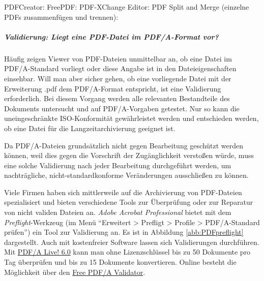 \begin{flushleft}
	PDFCreator: 
	FreePDF: 
	PDF-XChange Editor: 
	PDF Split and Merge (einzelne PDFs zusammenfügen und trennen): 	
\end{flushleft}


\subparagraph{Validierung: Liegt eine PDF-Datei im PDF/A-Format vor?}
\label{pdf-validierung}
Häufig zeigen Viewer von PDF-Dateien unmittelbar an, ob eine Datei im PDF/A-Standard vorliegt oder diese Angabe ist in den Dateieigenschaften einsehbar. Will man aber sicher gehen, ob eine vorliegende Datei mit der Erweiterung .pdf dem PDF/A-Format entspricht, ist eine Validierung erforderlich. Bei diesem Vorgang werden alle relevanten Bestandteile des Dokuments untersucht und auf PDF/A-Vorgaben getestet. Nur so kann die uneingeschränkte ISO-Konformität gewährleistet werden und entschieden werden, ob eine Datei für die Langzeitarchivierung geeignet ist.  

Da PDF/A-Dateien grundsätzlich nicht gegen Bearbeitung geschützt werden können, weil dies gegen die Vorschrift der Zugänglichkeit verstoßen würde, muss eine solche Validierung nach jeder Bearbeitung durchgeführt werden, um nachträgliche, nicht-standardkonforme Veränderungen ausschließen zu können. 

Viele Firmen haben sich mittlerweile auf die Archivierung von PDF-Dateien spezialisiert und bieten verschiedene Tools zur Überprüfung oder zur Reparatur von nicht validen Dateien an. \emph{Adobe Acrobat Professional} bietet mit dem \emph{Preflight}-Werkzeug (im Menü "`Erweitert > Prefligt > Profile > PDF/A-Standard prüfen"') ein Tool zur Validierung an. Es ist in Abbildung \ref{abb:PDFpreflight} dargestellt. Auch mit kostenfreier Software lassen sich Validierungen durchführen. Mit \href{www.intarsys.de/pdf-produkte/pdfa-live}{PDF/A Live! 6.0} kann man ohne Lizenzschlüssel bis zu 50 Dokumente pro Tag überprüfen und bis zu 15 Dokumente konvertieren. Online besteht die Möglichkeit über den \href{www.validatepdfa.com/online.htm}{Free PDF/A Validator}.

